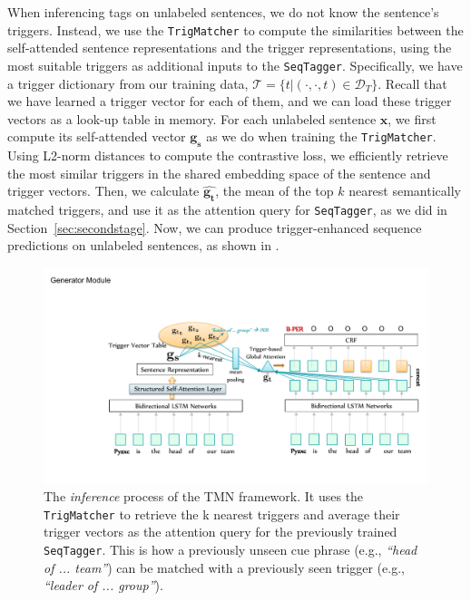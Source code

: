 When inferencing tags on unlabeled sentences,
we do not know the sentence's triggers.
Instead, we use the \texttt{TrigMatcher} to compute the similarities between the self-attended sentence representations and the trigger representations, using the most suitable triggers as additional inputs to the \texttt{SeqTagger}.
Specifically, we have a trigger dictionary from our training data, $\mathcal{T}=\{t | (\cdot, \cdot, t) \in \mathcal{D}_T\}$.
Recall that we have learned a trigger vector for each of them, and we can load these trigger vectors as a look-up table in memory.
For each unlabeled sentence $\mathbf{x}$, we first compute its self-attended vector $\mathbf{g_s}$ as we do when training the \texttt{TrigMatcher}.
Using L2-norm distances to compute the contrastive loss, we efficiently retrieve the most similar triggers in the shared embedding space of the sentence and trigger vectors.
Then, we calculate $\hat{\mathbf{g_t}}$, the mean of the top $k$ nearest semantically matched triggers, and use it as the attention query for \texttt{SeqTagger}, as we did in Section~\ref{sec:secondstage}.
Now, we can produce trigger-enhanced sequence predictions on unlabeled sentences, as shown in .

\begin{figure}[h]
 	\centering 
	\includegraphics[width=0.85\linewidth]{LatexDiss/figures/inference.pdf}
	\caption{The \textit{inference} process of the TMN framework. It uses the \texttt{TrigMatcher} to retrieve the k nearest triggers and average their trigger vectors as the attention query for the previously trained \texttt{SeqTagger}. This is how a previously unseen cue phrase (e.g., \textit{``head of ... team''}) can be matched with a previously seen trigger (e.g., \textit{``leader of ... group''}).} 
	\label{fig:inference}
\end{figure}






